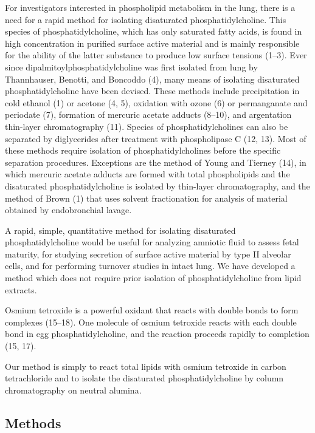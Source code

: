 \documentclass{article}
\begin{document}
For investigators interested in phospholipid metabolism in the lung, there is a need for a rapid method for isolating disaturated phosphatidylcholine. This species of phosphatidylcholine, which has only saturated fatty acids, is found in high concentration in purified surface active material and is mainly responsible for the ability of the latter substance to produce low surface tensions (1–3). Ever since dipalmitoylphosphatidylcholine was first isolated from lung by Thannhauser, Benotti, and Boncoddo (4), many means of isolating disaturated phosphatidylcholine have been devised. These methods include precipitation in cold ethanol (1) or acetone (4, 5), oxidation with ozone (6) or permanganate and periodate (7), formation of mercuric acetate adducts (8–10), and argentation thin-layer chromatography (11). Species of phosphatidylcholines can also be separated by diglycerides after treatment with phospholipase C (12, 13). Most of these methods require isolation of phosphatidylcholines before the specific separation procedures. Exceptions are the method of Young and Tierney (14), in which mercuric acetate adducts are formed with total phospholipids and the disaturated phosphatidylcholine is isolated by thin-layer chromatography, and the method of Brown (1) that uses solvent fractionation for analysis of material obtained by endobronchial lavage.

A rapid, simple, quantitative method for isolating disaturated phosphatidylcholine would be useful for analyzing amniotic fluid to assess fetal maturity, for studying secretion of surface active material by type II alveolar cells, and for performing turnover studies in intact lung. We have developed a method which does not require prior isolation of phosphatidylcholine from lipid extracts.

Osmium tetroxide is a powerful oxidant that reacts with double bonds to form complexes (15–18). One molecule of osmium tetroxide reacts with each double bond in egg phosphatidylcholine, and the reaction proceeds rapidly to completion (15, 17).

Our method is simply to react total lipids with osmium tetroxide in carbon tetrachloride and to isolate the disaturated phosphatidylcholine by column chromatography on neutral alumina.

\subsection*{Methods}
\end{document}
